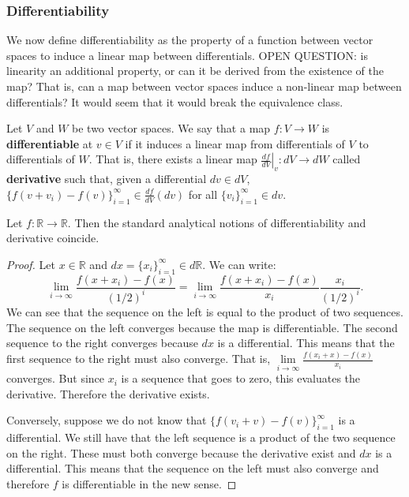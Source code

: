 \subsubsection{Differentiability}

We now define differentiability as the property of a function between vector spaces to induce a linear map between differentials. OPEN QUESTION: is linearity an additional property, or can it be derived from the existence of the map? That is, can a map between vector spaces induce a non-linear map between differentials? It would seem that it would break the equivalence class.

\begin{defn}
	Let $V$ and $W$ be two vector spaces. We say that a map $f: V \to W$ is \textbf{differentiable} at $v \in V$ if it induces a linear map from differentials of $V$ to differentials of $W$. That is, there exists a linear map $\left.\frac{df}{dV} \right|_v : dV \to dW$ called \textbf{derivative} such that, given a differential $dv \in dV$, $\{f(v +v_i) - f(v)\}_{i=1}^{\infty} \in \frac{df}{dV}(dv)$  for all $\{v_i\}_{i=1}^{\infty} \in dv$.
\end{defn}

\begin{prop}
	Let $f:\mathbb{R} \to \mathbb{R}$. Then the standard analytical notions of differentiability and derivative coincide.
\end{prop}
\begin{proof}
	Let $x \in \mathbb{R}$ and $dx=\{x_i\}_{i=1}^{\infty} \in d\mathbb{R}$. We can write:
	$$ \lim\limits_{i \to \infty} \frac{f(x +x_i) - f(x)}{(1/2)^i} = \lim\limits_{i \to \infty} \frac{f(x +x_i) - f(x)}{x_i}\frac{x_i}{(1/2)^i}.$$
	We can see that the sequence on the left is equal to the product of two sequences. The sequence on the left converges because the map is differentiable. The second sequence to the right converges because $dx$ is a differential. This means that the first sequence to the right must also converge. That is,  $\lim\limits_{i \to \infty} \frac{f(x_i +x) - f(x)}{x_i}$ converges. But since $x_i$ is a sequence that goes to zero, this evaluates the derivative. Therefore the derivative exists.
	
	Conversely, suppose we do not know that $\{f(v_i +v) - f(v)\}_{i=1}^{\infty}$ is a differential. We still have that the left sequence is a product of the two sequence on the right. These must both converge because the derivative exist and $dx$ is a differential. This means that the sequence on the left must also converge and therefore $f$ is differentiable in the new sense.
\end{proof}

